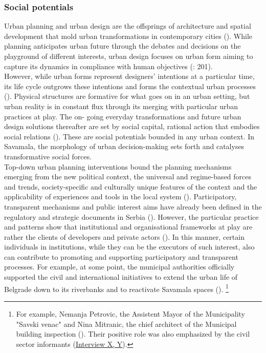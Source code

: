 \documentclass[11pt]{report}
\begin{document}
\subsubsection{Social potentials}

Urban planning and urban design are the offsprings of architecture and spatial development that mold urban transformations in contemporary cities (\href{ref}{\citealt{rode_city_2006}}).
While planning anticipates urban future through the debates and decisions on the playground of different interests, urban design focuses on urban form aiming to capture its dynamics in compliance with human objectives (\href{ref}{\citealt{lynch_theory_1958}}: 201).
\\

However, while urban forms represent designers’ intentions at a particular time, its life cycle outgrows these intentions and forms the contextual urban processes (\href{ref}{\citealt{tonkiss_cities_2014}}).
Physical structures are formative for what goes on in an urban setting, but urban reality is in constant flux through its merging with particular urban practices at play. The on- going everyday transformations and future urban design solutions thereafter are set by social capital, rational action that embodies social relations (\href{ref}{\citealt{coleman_social_1988}}).
These are social potentials bounded in any urban context.
In Savamala, the morphology of urban decision-making sets forth and catalyses transformative social forces.
\\

Top-down urban planning interventions bound the planning mechanisms emerging from the new political context, the universal and regime-based forces and trends, society-specific and culturally unique features of the context and the applicability of experiences and tools in the local system (\href{ref}{\citealt{nedovic-budic_adjustment_2001}}).
Participatory, transparent mechanisms and public interest aims have already been defined in the regulatory and strategic documents in Serbia  (\href{ref}{\citealt{vujosevic_conundrum_2012}}).
However, the particular practice and patterns show that institutional and organisational frameworks at play are rather the clients of developers and private actors (\href{ref}{\citealt{mrdjenovic_tatjana_urban_2015}}).
In this manner, certain individuals in institutions, while they can be the executors of such interest, also can contribute to promoting and supporting participatory and transparent processes.
For example, at some point, the municipal authorities officially supported the civil and international initiatives to extend the urban life of Belgrade down to its riverbanks and to reactivate Savamala spaces (\href{ref}{\citealt{doytchinov_urban_2015}}).
\footnote{For example, Nemanja Petrovic, the Assistent Mayor of the Municipality "Savski venac" and Nina Mitranic, the chief architect of the Municipal building inspection (\href{ref}{\citealt{doytchinov_urban_2015}}). Their positive role was also emphasized by the civil sector informants (\href{InterviewX}{Interview X, Y}).}
\\
\end{document}
